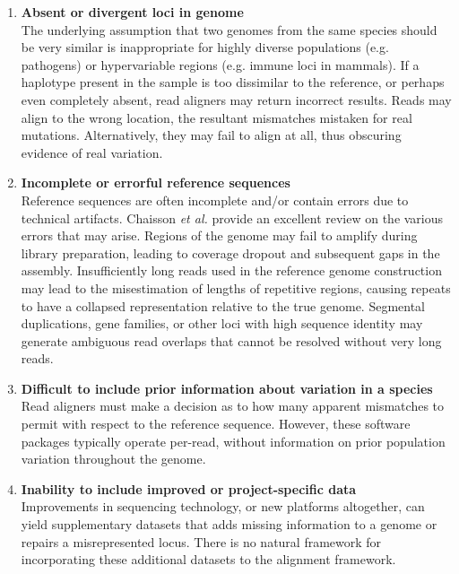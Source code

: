 \begin{enumerate}
\item \textbf{Absent or divergent loci in genome} \hfill \\ The underlying assumption that two genomes from the same species should be very similar is inappropriate for highly diverse populations (e.g. pathogens) or hypervariable regions (e.g. immune loci in mammals).  If a haplotype present in the sample is too dissimilar to the reference, or perhaps even completely absent, read aligners may return incorrect results.  Reads may align to the wrong location, the resultant mismatches mistaken for real mutations.  Alternatively, they may fail to align at all, thus obscuring evidence of real variation.

\item \textbf{Incomplete or errorful reference sequences} \hfill \\ Reference sequences are often incomplete and/or contain errors due to technical artifacts.  Chaisson \textit{et al.} provide an excellent review on the various errors that may arise\cite{Chaisson:2015dg}.  Regions of the genome may fail to amplify during library preparation, leading to coverage dropout and subsequent gaps in the assembly.  Insufficiently long reads used in the reference genome construction may lead to the misestimation of lengths of repetitive regions, causing repeats to have a collapsed representation relative to the true genome.  Segmental duplications, gene families, or other loci with high sequence identity may generate ambiguous read overlaps that cannot be resolved without very long reads.

\item \textbf{Difficult to include prior information about variation in a species} \hfill \\ Read aligners must make a decision as to how many apparent mismatches to permit with respect to the reference sequence.  However, these software packages typically operate per-read, without information on prior population variation throughout the genome.  

\item \textbf{Inability to include improved or project-specific data} \hfill \\ Improvements in sequencing technology, or new platforms altogether, can yield supplementary datasets that adds missing information to a genome or repairs a misrepresented locus.  There is no natural framework for incorporating these additional datasets to the alignment framework.
\end{enumerate}

